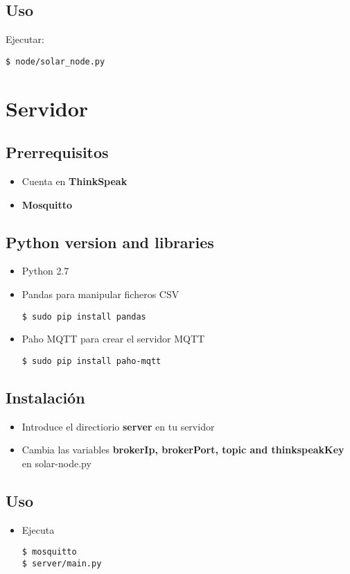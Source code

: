 \subsection{Uso}
Ejecutar:
\begin{lstlisting}[frame=single]
$ node/solar_node.py
\end{lstlisting}

\section{Servidor}
\subsection{Prerrequisitos}
	\begin{itemize}
		\item Cuenta en \textbf{ThinkSpeak}
		\item \textbf{Mosquitto}
	\end{itemize}
\subsection{Python version and libraries}
	\begin{itemize}
		\item Python 2.7
		\item Pandas para manipular ficheros CSV
\begin{lstlisting}[frame=single]
$ sudo pip install pandas
\end{lstlisting}
		\item Paho MQTT para crear el servidor MQTT
\begin{lstlisting}[frame=single]
$ sudo pip install paho-mqtt
\end{lstlisting}

	\end{itemize}
\subsection{Instalación}
\begin{itemize}
	\item Introduce el directiorio \textbf{server} en tu servidor
	\item Cambia las variables \textbf{brokerIp, brokerPort, topic and thinkspeakKey} en solar-node.py
\end{itemize}
\subsection{Uso}
\begin{itemize}
	\item Ejecuta
\begin{lstlisting}[frame=single]
$ mosquitto
$ server/main.py
\end{lstlisting}
\end{itemize}